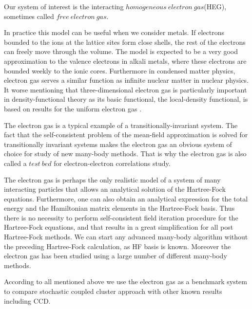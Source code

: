 \documentclass[twoside,english]{uiofysmaster}
\begin{document}
Our system of interest is the interacting $homogeneous\ electron\ gas$(HEG), sometimes called $free\ electron\ gas$. 

In practice this model can be useful when we consider metals. If electrons bounded to the ions at the lattice sites form close shells, the rest of the electrons can freely move through the volume. The model is expected to be a very good approximation to the valence electrons in alkali metals, where these electrons are bounded weekly to the ionic cores\cite{GrossManyparticletheory1991}.
Furthermore in condensed matter physics, electron gas serves a similar function as infinite nuclear matter in nuclear physics\cite{Hjorth-Jensenadvancedcoursecomputational2017}. It worse mentioning that three-dimensional electron gas is particularly important in density-functional theory as its basic functional, the local-density functional, is based on results for the uniform electron gas \cite{ShollDensityFunctionalTheory2009}.


The electron gas is a typical example of a transitionally-invariant system. The fact that the self-consistent problem of the mean-field approximation is solved for transitionally invariant systems makes the electron gas an obvious system of choice for study of new many-body methods. That is why the electron gas is also called a $test\ bed$ for electron-electron correlations study. 


The electron gas is perhaps the only realistic model of a system of many interacting particles that allows an analytical solution of the Hartree-Fock equations. Furthermore, one can also obtain an analytical expression for the total energy and  the Hamiltonian matrix elements in the Hartree-Fock basis. Thus there is no necessity to perform self-consistent field iteration procedure for the Hartree-Fock equations, and that results in a great simplification for all post Hartree-Fock methods. We can start any advanced many-body algorithm without the preceding Hartree-Fock calculation, as HF basis is known.
Moreover the electron gas has been studied using a large number of different many-body methods. 

According to all mentioned above we use the electron gas as a benchmark system to compare stochastic coupled cluster approach with other known results including CCD.
\end{document}
